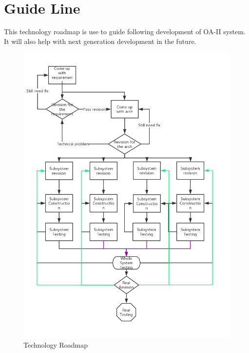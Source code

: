 \documentclass[12pt,article]{memoir}
\begin{document}
\section{Guide Line}
This technology roadmap is use to guide following development of OA-II system. It will also help with next generation development in the future.
\begin{figure}[htp]
	\includegraphics[width=\textwidth]{AD00002_RP.png}
	\caption{Technology Roadmap}	
\end{figure}

\end{document}
